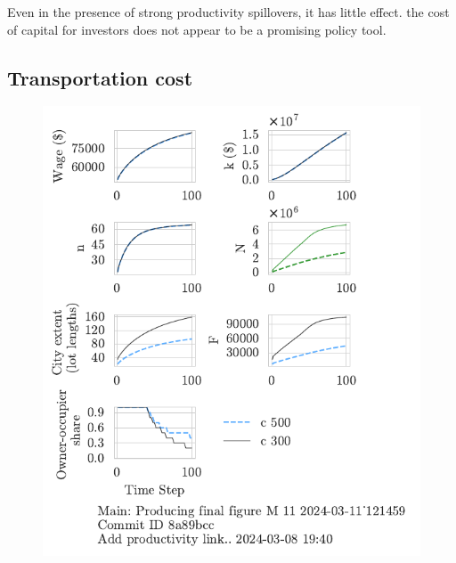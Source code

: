 Even in the presence of strong productivity spillovers, it has little effect.  the cost of capital for investors does not appear to be a promising policy tool.

\newpage
\subsection{Transportation cost}
\begin{figure}[h!tb] 
    \centering
    \includegraphics[scale=.75, trim={0 1.4cm 1.5cm 0},clip]{fig/c-Main-121459.pdf} 

\end{figure}

